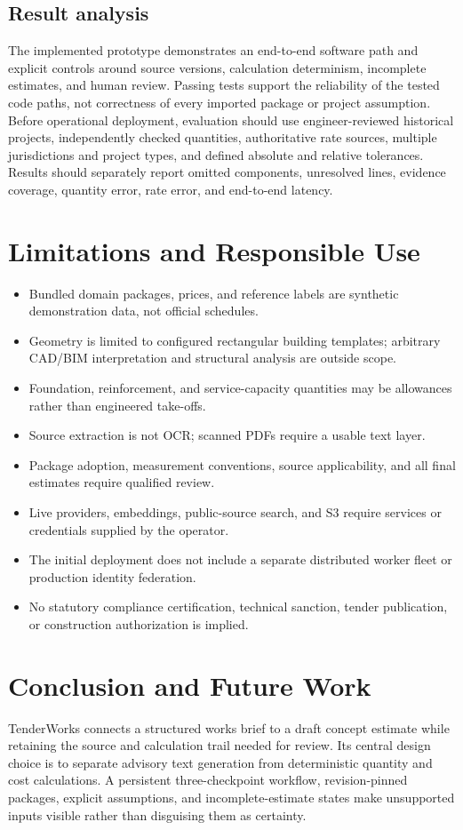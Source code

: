 \subsection{Result analysis}
The implemented prototype demonstrates an end-to-end software path and explicit controls around source versions, calculation determinism, incomplete estimates, and human review. Passing tests support the reliability of the tested code paths, not correctness of every imported package or project assumption. Before operational deployment, evaluation should use engineer-reviewed historical projects, independently checked quantities, authoritative rate sources, multiple jurisdictions and project types, and defined absolute and relative tolerances. Results should separately report omitted components, unresolved lines, evidence coverage, quantity error, rate error, and end-to-end latency.

\section{Limitations and Responsible Use}
\begin{itemize}[leftmargin=*]
  \item Bundled domain packages, prices, and reference labels are synthetic demonstration data, not official schedules.
  \item Geometry is limited to configured rectangular building templates; arbitrary CAD/BIM interpretation and structural analysis are outside scope.
  \item Foundation, reinforcement, and service-capacity quantities may be allowances rather than engineered take-offs.
  \item Source extraction is not OCR; scanned PDFs require a usable text layer.
  \item Package adoption, measurement conventions, source applicability, and all final estimates require qualified review.
  \item Live providers, embeddings, public-source search, and S3 require services or credentials supplied by the operator.
  \item The initial deployment does not include a separate distributed worker fleet or production identity federation.
  \item No statutory compliance certification, technical sanction, tender publication, or construction authorization is implied.
\end{itemize}

\section{Conclusion and Future Work}
TenderWorks connects a structured works brief to a draft concept estimate while retaining the source and calculation trail needed for review. Its central design choice is to separate advisory text generation from deterministic quantity and cost calculations. A persistent three-checkpoint workflow, revision-pinned packages, explicit assumptions, and incomplete-estimate states make unsupported inputs visible rather than disguising them as certainty.

